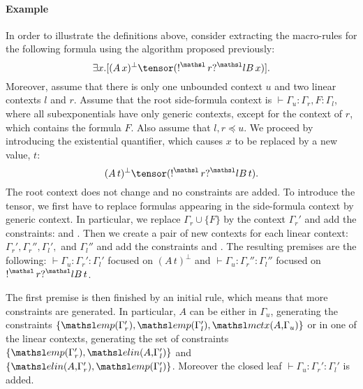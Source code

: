 
\paragraph{Example} In order to illustrate the definitions above, consider
extracting the macro-rules for the following 
formula using the algorithm proposed previously: 
\[\exists x. [(A\,x)^\bot \tensor (\nbang{r} \nquest{l} B\,x)].
\]
Moreover, assume that there is only one unbounded context $u$ and two 
linear contexts $l$ and $r$. Assume that the root side-formula context is
$\vdash \Gamma_u : \Gamma_r, F : \Gamma_l$, where all subexponentials have
only 
generic contexts, except for the context of $r$, which contains the formula
$F$. Also assume that $l, r \preceq u$. We proceed by introducing the
existential quantifier, which causes 
$x$ to be replaced by a new value, $t$: 
\[
 (A\,t)^\bot \tensor (\nbang{r} \nquest{l} B\,t).
\]
The root context does not change and no constraints are added. To introduce
the tensor, we first have to replace formulas appearing in the side-formula
context by 
generic context. In particular, we replace $\Gamma_r \cup \{F\}$ by the 
context $\Gamma_r'$ and add the constraints:
 and . Then we
create a pair of new contexts for each linear context: $\Gamma_r',
\Gamma_r'', \Gamma_l',$ and $\Gamma_l''$ and add the constraints 
 and
. The resulting premises are 
the following: $\vdash \Gamma_u : \Gamma_r' : \Gamma_l'$ focused on 
$(A\,t)^\bot$ and $\vdash \Gamma_u : \Gamma_r'' : \Gamma_l''$ focused on $\nbang{r} \nquest{l} B\,t$. 

The first premise is then finished by an initial rule, which means that 
more constraints are generated. In particular, $A$ can be either in 
$\Gamma_u$, generating the constraints $\{\emp{\Gamma_r'},
\emp{\Gamma_l'}, \mctx{A}{\Gamma_u}\}$ or in one of the linear contexts,
generating the set of constraints $\{\emp{\Gamma_r'},
\elin{A}{\Gamma_l'}\}$ and $\{\elin{A}{\Gamma_r'}, \emp{\Gamma_l'}\}$. 
Moreover the closed leaf $\vdash \Gamma_u : \Gamma_r' : \Gamma_l'$ is 
added. 

